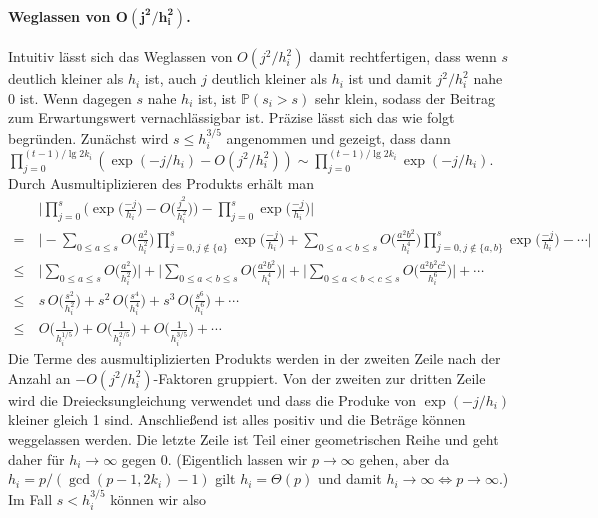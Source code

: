 \documentclass[a4paper, 10pt, ngerman]{article}
\renewcommand{\P}{\mathbb{P}}
\begin{document}
\paragraph{Weglassen von $\boldsymbol{O(j^2/h_i^2)}$.} Intuitiv lässt sich das Weglassen von $O(j^2/h_i^2)$ damit rechtfertigen, dass wenn $s$ deutlich kleiner als $h_i$ ist, auch $j$ deutlich kleiner als $h_i$ ist und damit $j^2/h_i^2$ nahe 0 ist. Wenn dagegen $s$ nahe $h_i$ ist, ist $\P(s_i > s)$ sehr klein, sodass der Beitrag zum Erwartungswert vernachlässigbar ist. Präzise lässt sich das wie folgt begründen. Zunächst wird $s \le h_{i}^{3/5}$ angenommen und gezeigt, dass dann $\prod_{j = 0}^{(t-1) / \lg 2k_i} (\exp (-j/h_i) - O (j^2/h_i^2)) \sim \prod_{j = 0}^{(t-1) / \lg 2k_i} \exp (-j/h_i)$. Durch Ausmultiplizieren des Produkts erhält man
\begin{align*}
        & \ \Bigg \vert
    \prod_{j = 0}^{s} \Bigg ( \exp \bigg ( \frac {-j}{h_i} \bigg )
    - O \bigg ( \frac {j^2} {h_i^2} \bigg ) \Bigg )
    - \prod_{j = 0}^{s} \exp \bigg ( \frac {-j}{h_i} \bigg )
    \Bigg \vert          \\
    =   & \ \Bigg \vert
    - \sum_{0 \le a \le s} O \bigg ( \frac {a^2} {h_i^2} \bigg )
    \prod_{j = 0, j \notin \{a\}}^{s} \exp \bigg ( \frac {-j}{h_i} \bigg )
    + \sum_{0 \le a < b \le s} O \bigg ( \frac {a^2b^2} {h_i^4} \bigg )
    \prod_{j = 0, j \notin \{a, b\}}^{s}
    \exp \bigg ( \frac {-j}{h_i} \bigg ) - \cdots
    \Bigg \vert          \\
    \le & \ \Bigg \vert
    \sum_{0 \le a \le s} O \bigg ( \frac {a^2} {h_i^2} \bigg )
    \Bigg \vert + \Bigg \vert
    \sum_{0 \le a < b \le s} O \bigg ( \frac {a^2b^2} {h_i^4} \bigg )
    \Bigg \vert + \Bigg \vert
    \sum_{0 \le a < b < c \le s} O \bigg ( \frac {a^2b^2c^2} {h_i^6} \bigg )
    \Bigg \vert + \cdots \\
    \le & \
    s \, O \bigg ( \frac {s^2} {h_i^2} \bigg )
    +s^2 \, O \bigg ( \frac {s^4} {h_i^4} \bigg )
    +     s^3 \,  O \bigg ( \frac {s^6} {h_i^6} \bigg )
    + \cdots             \\
    \le & \
    O \bigg ( \frac 1 {h_i^{1/5}} \bigg )
    + O \bigg ( \frac 1 {h_i^{2/5}} \bigg )
    + O \bigg ( \frac 1 {h_i^{3/5}} \bigg )
    + \cdots
\end{align*}
Die Terme des ausmultiplizierten Produkts werden in der zweiten Zeile nach der Anzahl an $-O(j^2/h_i^2)$-Faktoren gruppiert. Von der zweiten zur dritten Zeile wird die Dreiecksungleichung verwendet und dass die Produke von $\exp(-j/h_i)$ kleiner gleich 1 sind. Anschließend ist alles positiv und die Beträge können weggelassen werden. Die letzte Zeile ist Teil einer geometrischen Reihe und geht daher für $h_i \to \infty$ gegen 0. (Eigentlich lassen wir $p \to \infty$ gehen, aber da $h_i = p/(\gcd(p - 1, 2k_i) - 1)$ gilt $h_i = \Theta(p)$ und damit $h_i \to \infty \Longleftrightarrow p \to \infty$.) Im Fall $s < h_i^{3/5}$ können wir also
\end{document}
